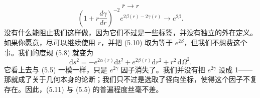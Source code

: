 \begin{equation*}
\bar{r} \to r
\tag{5.9}
\end{equation*}
\begin{equation*}
\left(1 + r\frac{d\gamma}{dr}\right)^{-2}e^{2\beta(r)-2\gamma(r)} \to e^{2\beta}.
\tag{5.10}
\end{equation*}
没有什么能阻止我们这样做，因为它们不过是一些标签，并没有独立的外在定义。如果你愿意，尽可以继续使用 $\bar{r}$，并把 (5.10) 取为等于 $e^{2\bar{\beta}}$，但我们不想费这个事。我们的度规 (5.8) 就变为
\begin{equation*}
\mathrm{d}s^2 = -e^{2\alpha(r)}\mathrm{d}t^2 + e^{2\beta(r)}\mathrm{d}r^2 + r^2\,\mathrm{d}\Omega^2.
\tag{5.11}
\end{equation*}
它看上去与 (5.5) 一模一样，只是 $e^{2\gamma}$ 因子消失了。我们并没有把 $e^{2\gamma}$ 设成 1——那就成了关于几何本身的论断；我们只不过是选取了径向坐标，使得这个因子不复存在。因此，(5.11) 与 (5.5) 的普遍程度丝毫不差。

